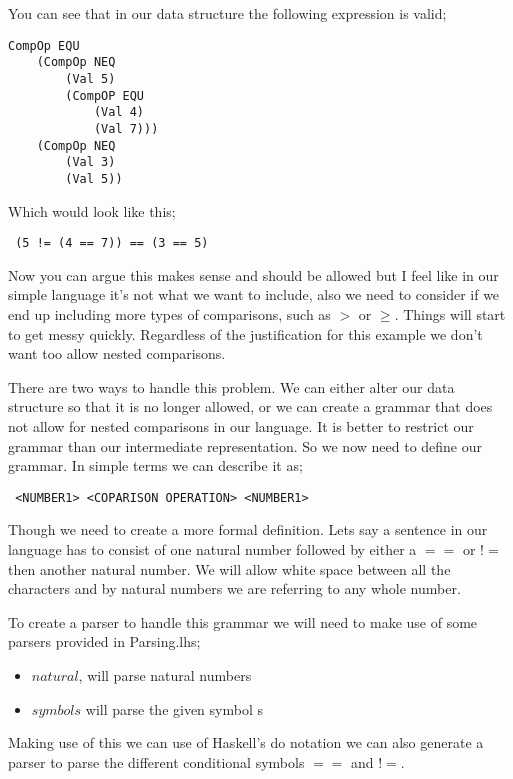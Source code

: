 \newpage

You can see that in our data structure the following expression is valid;

\begin{lstlisting}
CompOp EQU 
	(CompOp NEQ 
		(Val 5) 
		(CompOP EQU 
			(Val 4)
			(Val 7))) 
	(CompOp NEQ 
		(Val 3) 
		(Val 5))
\end{lstlisting}

Which would look like this;

\begin{lstlisting}
 (5 != (4 == 7)) == (3 == 5)
\end{lstlisting}

Now you can argue this makes sense and should be allowed but I feel like in our simple language it's not what we want to include, also we need to consider if we end up including more types of comparisons, such as $>$ or $\geq$. Things will start to get messy quickly. Regardless of the justification for this example we don't want too allow nested comparisons. 

There are two ways to handle this problem. We can either alter our data structure so that it is no longer allowed, or we can create a grammar that does not allow for nested comparisons in our language. It is better to restrict our grammar than our intermediate representation. So we now need to define our grammar. In simple terms we can describe it as;

\begin{lstlisting}
 <NUMBER1> <COPARISON OPERATION> <NUMBER1>
\end{lstlisting}   	

Though we need to create a more formal definition. Lets say a sentence in our language has to consist of one natural number followed by either a $==$ or $!=$ then another natural number. We will allow white space between all the characters and by natural numbers we are referring to any whole number. 


To create a parser to handle this grammar we will need to make use of some parsers provided in Parsing.lhs;

\begin{itemize}
\item $natural$, will parse natural numbers
\item $symbol s$ will parse the given symbol s 
\end{itemize}

Making use of this we can use of Haskell's do notation we can also generate a parser to parse the different conditional symbols $==$ and $!=$. 

